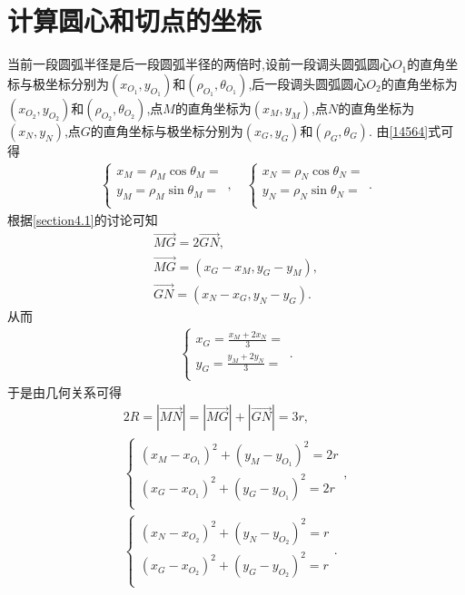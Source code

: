 \documentclass[lang=cn,newtx,10pt,scheme=chinese]{../Template/elegantbook}
\begin{document}
\section{计算圆心和切点的坐标}

当前一段圆弧半径是后一段圆弧半径的两倍时,设前一段调头圆弧圆心$O_1$的直角坐标与极坐标分别为$(x_{O_1},y_{O_1})$和$(\rho_{O_1},\theta_{O_1})$,后一段调头圆弧圆心$O_2$的直角坐标为$(x_{O_2},y_{O_2})$和$(\rho_{O_2},\theta_{O_2})$,点$M$的直角坐标为$(x_{M},y_{M})$,点$N$的直角坐标为$(x_{N},y_{N})$,点$G$的直角坐标与极坐标分别为$(x_{G},y_{G})$和$(\rho_{G},\theta_{G})$.
由\eqref{14564}式可得
\begin{align}
\begin{cases}
x_M=\rho _M\cos \theta _M=\\
y_M=\rho _M\sin \theta _M=\\
\end{cases},\quad \begin{cases}
x_N=\rho _N\cos \theta _N=\\
y_N=\rho _N\sin \theta _N=\\
\end{cases}.
\end{align}
根据\eqref{section4.1}的讨论可知
\begin{gather}
\overrightarrow{MG}=2\overrightarrow{GN},
\\
\overrightarrow{MG}=\left( x_G-x_M,y_G-y_M \right) ,
\\
\overrightarrow{GN}=\left( x_N-x_G,y_N-y_G \right) .
\end{gather}
从而
\begin{align}
\begin{cases}
x_G=\frac{x_M+2x_N}{3}=\\
y_G=\frac{y_M+2y_N}{3}=\\
\end{cases}.
\end{align}
于是由几何关系可得
\begin{align}
2R=\left| \overrightarrow{MN} \right|=\left| \overrightarrow{MG} \right|+\left| \overrightarrow{GN} \right|=3r,
\\
\begin{cases}
\left( x_M-x_{O_1} \right) ^2+\left( y_M-y_{O_1} \right) ^2=2r\\
\left( x_G-x_{O_1} \right) ^2+\left( y_G-y_{O_1} \right) ^2=2r\\
\end{cases},
\\
\begin{cases}
\left( x_N-x_{O_2} \right) ^2+\left( y_N-y_{O_2} \right) ^2=r\\
\left( x_G-x_{O_2} \right) ^2+\left( y_G-y_{O_2} \right) ^2=r\\
\end{cases}.
\end{align}
\end{document}
